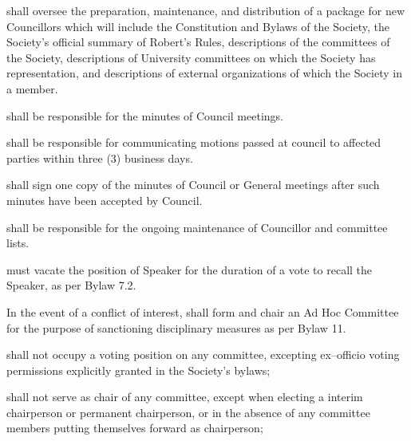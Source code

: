 \begin{longenum}[ label*=\thesubsection.\arabic*., align=left]
    \item shall oversee the preparation, maintenance, and distribution of a package for new Councillors which will include the Constitution and Bylaws of the Society, the Society's official summary of Robert's Rules, descriptions of the committees of the Society, descriptions of University committees on which the Society has representation, and descriptions of external organizations of which the Society in a member.
    \item shall be responsible for the minutes of Council meetings.
    \item shall be responsible for communicating motions passed at council to affected parties within three (3) business days. 
    \item shall sign one copy of the minutes of Council or General meetings after such minutes have been accepted by Council.
    \item shall be responsible for the ongoing maintenance of Councillor and committee lists.
    \item must vacate the position of Speaker for the duration of a vote to recall the Speaker, as per Bylaw 7.2.
    \item In the event of a conflict of interest, shall form and chair an Ad Hoc Committee for the purpose of sanctioning disciplinary measures as per Bylaw 11.
     \item shall not occupy a voting position on any committee, excepting ex--officio voting permissions explicitly granted in the Society's bylaws;
	\item shall not serve as chair of any committee, except when electing a interim chairperson or permanent chairperson, or in the absence of any committee members putting themselves forward as chairperson;
\end{longenum}

